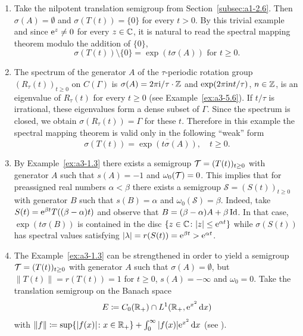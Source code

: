 \begin{example}\label{ex:a3-6.1}%
\begin{enumerate}[\upshape (i), wide, labelindent=.25em]

\item
{}
Take the nilpotent translation semigroup from Section~\ref{subsec:a1-2.6}. Then $\sigma(A) = \emptyset$ and $\sigma(T(t)) = \{0\}$ for every $t > 0$.
By this trivial example and since $\mathrm{e}^{z} \neq 0$ for every $z \in \mathbb{C}$, it is natural to read the spectral mapping theorem modulo the addition of\/ $\{0\}$, \ie 
\[
\sigma(T(t)) \setminus \{0\} = \exp(t\sigma(A))  \text{ for } t \geq 0 .
\]

\item
{}
The spectrum of the generator $A$ of the $\tau$-periodic rotation group $(R_{\tau}(t))_{t \geq 0}$ on $C(\Gamma)$ is $\sigma(A) = 2\pi\mathrm{i} /\tau\cdot\mathbb{Z}$ and $\exp(2\pi\mathrm{i} nt/\tau)$, $n \in \mathbb{Z}$, is an eigenvalue of\/ $R_{\tau}(t)$ for every $t \geq 0$ (see Example~\ref{ex:a3-5.6}).
If\/ $t/\tau$ is irrational, these eigenvalues form a dense subset of\/ $\Gamma$.
Since the spectrum is closed, we obtain $\sigma(R_{\tau}(t)) = \Gamma$ for these $t$.
Therefore in this example the spectral mapping theorem is valid only in the following \enquote{weak} form
\[
\sigma(T(t)) = \overline{\exp(t\sigma(A))}, \quad t \geq 0 .
\]

\item 
By Example~\ref{ex:a3-1.3} there exists a semigroup $\TT = (T(t))_{t \geq 0}$ with generator $A$ such that $s(A) = -1$ and $\omega_{0}(\mathcal{T}) = 0$.
This implies that for preassigned real numbers $\alpha < \beta$ there exists a semigroup $\mathcal{S} = (S(t))_{t \geq 0}$ with generator $B$ such that $s(B) = \alpha$ and $\omega_{0}(\mathcal{S}) = \beta$. Indeed, take $S(t) = \mathrm{e}^{\beta t}T((\beta - \alpha)t)$ and observe that $B = (\beta-\alpha)A + \beta\operatorname{Id}$. 
In that case, $\exp(t\sigma(B))$ is contained in the disc $\{z \in \C \colon |z| \leq \eu^{\alpha t}\}$ 
while $\sigma(S(t))$ has spectral values satisfying $|\lambda| = r(S(t)) = \mathrm{e}^{\beta t} > \mathrm{e}^{\alpha t}$. 


\item 
The Example~\ref{ex:a3-1.3} can be strengthened in order to yield a semigroup $\TT = (T(t))_{t \geq 0}$ with generator $A$ such that $\sigma(A) = \emptyset$, but $\|T(t)\| = r(T(t)) = 1$ for $t \geq 0$, \ie $s(A) = -\infty$ and $\omega_{0} = 0$. 
Take the translation semigroup on the Banach space
\[
E \coloneq C_{0}(\mathbb{R}_{+}) \cap L^{1}(\mathbb{R}_{+}, \mathrm{e}^{x^{2}}\mathop{}\!\mathrm{d}{x})
\]
with $\|f\| \coloneq \sup \{|f(x)| \colon x \in \mathbb{R}_{+}\} + \int_{0}^{\infty} |f(x)|\mathrm{e}^{x^{2}} \mathop{}\!\mathrm{d}{x}$ (see \textcite{greinervoigtwolff:1981}).


\end{enumerate}
\end{example}
